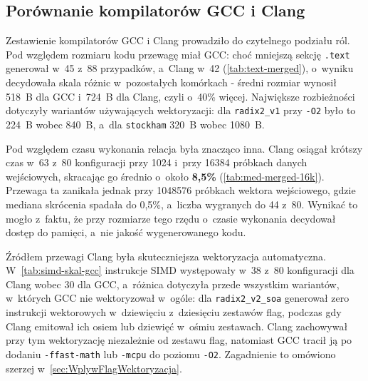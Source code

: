 \subsection{Porównanie kompilatorów GCC i Clang}
Zestawienie kompilatorów GCC i Clang prowadziło do czytelnego podziału ról. Pod względem
rozmiaru kodu przewagę miał GCC: choć mniejszą sekcję \texttt{.text} generował
w~45 z~88 przypadków, a~Clang w~42 (\cref{tab:text-merged}), o~wyniku decydowała
skala różnic w~pozostałych komórkach - średni rozmiar wynosił 518~B dla GCC
i~724~B dla Clang, czyli o~40\% więcej. Największe rozbieżności dotyczyły
wariantów używających wektoryzacji: dla \texttt{radix2\_v1} przy \texttt{-O2} było to
224~B wobec 840~B, a~dla \texttt{stockham} 320~B wobec 1080~B.

Pod względem czasu wykonania relacja była znacząco inna. Clang osiągał krótszy czas w~63 z~80 konfiguracji przy 1024 i~przy 16384
próbkach danych wejściowych, skracając go średnio o~około \textbf{8,5\%}
(\cref{tab:med-merged-16k}). Przewaga ta zanikała jednak przy 1048576 próbkach wektora wejściowego,
gdzie mediana skrócenia spadała do 0,5\%, a~liczba wygranych do 44 z~80. Wynikać to mogło z~faktu, że przy rozmiarze tego rzędu
o~czasie wykonania decydował dostęp do pamięci, a~nie jakość
wygenerowanego kodu.

Źródłem przewagi Clang była skuteczniejsza wektoryzacja automatyczna.
W~\cref{tab:simd-skal-gcc} instrukcje SIMD występowały w~38 z~80 konfiguracji dla
Clang wobec 30 dla GCC, a~różnica dotyczyła przede wszystkim wariantów, w~których
GCC nie wektoryzował w~ogóle: dla \texttt{radix2\_v2\_soa} generował zero
instrukcji wektorowych w~dziewięciu z~dziesięciu zestawów flag, podczas gdy
Clang emitował ich osiem lub dziewięć w~ośmiu zestawach. Clang zachowywał przy tym
wektoryzację niezależnie od zestawu flag, natomiast GCC tracił ją po dodaniu
\texttt{-ffast-math} lub \texttt{-mcpu} do poziomu \texttt{-O2}. Zagadnienie to
omówiono szerzej w~\cref{sec:WplywFlagWektoryzacja}.

